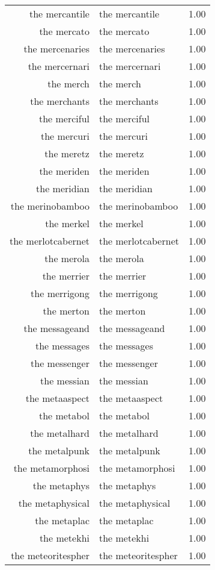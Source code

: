 \begin{table}[ht]
\begin{tabular}{rlr}
  the mercantile & the mercantile & 1.00 \\ 
  the mercato & the mercato & 1.00 \\ 
  the mercenaries & the mercenaries & 1.00 \\ 
  the mercernari & the mercernari & 1.00 \\ 
  the merch & the merch & 1.00 \\ 
  the merchants & the merchants & 1.00 \\ 
  the merciful & the merciful & 1.00 \\ 
  the mercuri & the mercuri & 1.00 \\ 
  the meretz & the meretz & 1.00 \\ 
  the meriden & the meriden & 1.00 \\ 
  the meridian & the meridian & 1.00 \\ 
  the merinobamboo & the merinobamboo & 1.00 \\ 
  the merkel & the merkel & 1.00 \\ 
  the merlotcabernet & the merlotcabernet & 1.00 \\ 
  the merola & the merola & 1.00 \\ 
  the merrier & the merrier & 1.00 \\ 
  the merrigong & the merrigong & 1.00 \\ 
  the merton & the merton & 1.00 \\ 
  the messageand & the messageand & 1.00 \\ 
  the messages & the messages & 1.00 \\ 
  the messenger & the messenger & 1.00 \\ 
  the messian & the messian & 1.00 \\ 
  the metaaspect & the metaaspect & 1.00 \\ 
  the metabol & the metabol & 1.00 \\ 
  the metalhard & the metalhard & 1.00 \\ 
  the metalpunk & the metalpunk & 1.00 \\ 
  the metamorphosi & the metamorphosi & 1.00 \\ 
  the metaphys & the metaphys & 1.00 \\ 
  the metaphysical & the metaphysical & 1.00 \\ 
  the metaplac & the metaplac & 1.00 \\ 
  the metekhi & the metekhi & 1.00 \\ 
  the meteoritespher & the meteoritespher & 1.00 \\ 

\end{tabular}
\end{table}
